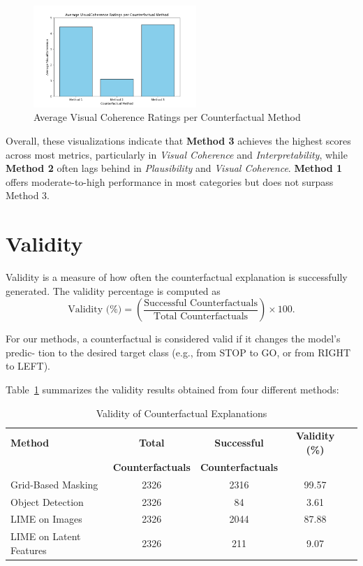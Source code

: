 \begin{figure}[htbp]
    \centering
    \includegraphics[width=0.55\textwidth]{img/results/VisualCoherence_ratings.png}
    \caption{Average Visual Coherence Ratings per Counterfactual Method}
    \label{fig:visualCoherenceBar}
\end{figure}

Overall, these visualizations indicate that \textbf{Method 3} achieves the highest scores across most metrics, particularly in 
\textit{Visual Coherence} and \textit{Interpretability}, while \textbf{Method 2} often lags behind in \textit{Plausibility} and 
\textit{Visual Coherence}. \textbf{Method 1} offers moderate-to-high performance in most categories but does not surpass Method 3.

\section{Validity}
\label{sec:validity}
Validity is a measure of how often the counterfactual explanation is successfully generated. 
The validity percentage is computed as
\[
\text{Validity (\%)} = \left( \frac{\text{Successful Counterfactuals}}{\text{Total Counterfactuals}} \right) \times 100.
\]

For our methods, a counterfactual is considered valid if it changes the model’s predic-
tion to the desired target class (e.g., from STOP to GO, or from RIGHT to LEFT). 

Table~\ref{tab:validity_results} summarizes the validity results obtained from four different methods:

\begin{table}[htbp]
    \centering
    \caption{Validity of Counterfactual Explanations}
    \label{tab:validity_results}
    \begin{tabular}{lcccc}
        \hline
        \textbf{Method} & \textbf{Total} & \textbf{Successful} & \textbf{Validity (\%)} \\
        & \textbf{Counterfactuals} & \textbf{Counterfactuals} & \\
        \hline
        Grid-Based Masking & 2326 & 2316 & 99.57 \\
        Object Detection & 2326 & 84 & 3.61 \\
        LIME on Images & 2326 & 2044 & 87.88 \\
        LIME on Latent Features & 2326 & 211 & 9.07 \\
        \hline
    \end{tabular}
\end{table}

